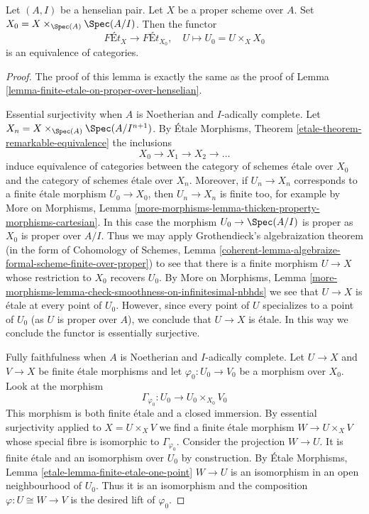 %
\begin{lemma}
\label{lemma-finite-etale-on-proper-over-henselian-pair}
Let $(A, I)$ be a henselian pair. Let $X$ be a proper scheme over $A$.
Set $X_0 = X \times_{\Spec(A)} \Spec(A/I)$. Then the functor
$$
\textit{F\'Et}_X \to \textit{F\'Et}_{X_0},\quad
U \longmapsto U_0 = U \times_X X_0
$$
is an equivalence of categories.
\end{lemma}

\begin{proof}
The proof of this lemma is exactly the same as the proof of
Lemma \ref{lemma-finite-etale-on-proper-over-henselian}.

\medskip\noindent
Essential surjectivity when $A$ is Noetherian and $I$-adically complete.
Let $X_n = X \times_{\Spec(A)} \Spec(A/I^{n + 1})$.
By \'Etale Morphisms, Theorem \ref{etale-theorem-remarkable-equivalence}
the inclusions
$$
X_0 \to X_1 \to X_2 \to \ldots
$$
induce equivalence of categories between the category
of schemes \'etale over $X_0$ and the category of schemes
\'etale over $X_n$.
Moreover, if $U_n \to X_n$ corresponds to a finite \'etale
morphism $U_0 \to X_0$, then $U_n \to X_n$ is finite too, for example
by More on Morphisms, Lemma
\ref{more-morphisms-lemma-thicken-property-morphisms-cartesian}.
In this case the morphism $U_0 \to \Spec(A/I)$
is proper as $X_0$ is proper over $A/I$. Thus we may apply
Grothendieck's algebraization theorem
(in the form of
Cohomology of Schemes, Lemma
\ref{coherent-lemma-algebraize-formal-scheme-finite-over-proper})
to see that there is a finite morphism $U \to X$ whose restriction
to $X_0$ recovers $U_0$. By More on Morphisms, Lemma
\ref{more-morphisms-lemma-check-smoothness-on-infinitesimal-nbhds}
we see that $U \to X$ is \'etale at every point of $U_0$.
However, since every point of $U$ specializes to a point of $U_0$
(as $U$ is proper over $A$), we conclude that $U \to X$ is \'etale.
In this way we conclude the functor is essentially surjective.

\medskip\noindent
Fully faithfulness when $A$ is Noetherian and $I$-adically complete.
Let $U \to X$ and $V \to X$ be finite \'etale morphisms and
let $\varphi_0 : U_0 \to V_0$ be a morphism over $X_0$. Look at
the morphism
$$
\Gamma_{\varphi_0} : U_0 \longrightarrow U_0 \times_{X_0} V_0
$$
This morphism is both finite \'etale and a closed immersion.
By essential surjectivity applied to $X = U \times_X V$ we find
a finite \'etale morphism $W \to U \times_X V$ whose special
fibre is isomorphic to $\Gamma_{\varphi_0}$. Consider the projection
$W \to U$. It is finite \'etale and an isomorphism over $U_0$ by
construction. By \'Etale Morphisms, Lemma
\ref{etale-lemma-finite-etale-one-point}
$W \to U$ is an isomorphism in an open neighbourhood of $U_0$.
Thus it is an isomorphism and the composition $\varphi : U \cong W \to V$
is the desired lift of $\varphi_0$.


\end{proof}
